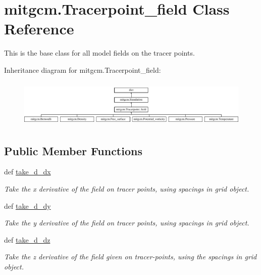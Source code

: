 \hypertarget{classmitgcm_1_1Tracerpoint__field}{\section{mitgcm.\+Tracerpoint\+\_\+field Class Reference}
\label{classmitgcm_1_1Tracerpoint__field}
}


This is the base class for all model fields on the tracer points.  


Inheritance diagram for mitgcm.\+Tracerpoint\+\_\+field\+:\begin{figure}[H]
\begin{center}
\leavevmode
\includegraphics[height=2.304527cm]{classmitgcm_1_1Tracerpoint__field}
\end{center}
\end{figure}
\subsection*{Public Member Functions}
\begin{DoxyCompactItemize}
\item 
def \hyperlink{classmitgcm_1_1Tracerpoint__field_aaf8a54b25699658f016209c2624ccaac}{take\+\_\+d\+\_\+dx}
\begin{DoxyCompactList}\small\item\em Take the x derivative of the field on tracer points, using spacings in grid object. \end{DoxyCompactList}\item 
def \hyperlink{classmitgcm_1_1Tracerpoint__field_abe875d49041c764c65b579c6a0ba6c13}{take\+\_\+d\+\_\+dy}
\begin{DoxyCompactList}\small\item\em Take the y derivative of the field on tracer points, using spacings in grid object. \end{DoxyCompactList}\item 
def \hyperlink{classmitgcm_1_1Tracerpoint__field_aae9d224b41b5cf62433fd5fe473a8116}{take\+\_\+d\+\_\+dz}
\begin{DoxyCompactList}\small\item\em Take the z derivative of the field given on tracer-\/points, using the spacings in grid object. \end{DoxyCompactList}\end{DoxyCompactItemize}
